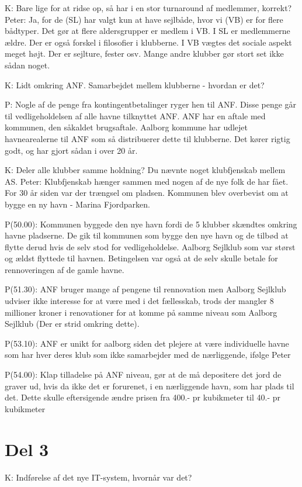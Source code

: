 K: Bare lige for at ridse op, så har i en stor turnaround af medlemmer, korrekt? Peter: Ja, for de (SL) har valgt kun at have sejlbåde, hvor vi (VB) er for flere bådtyper. Det gør at flere aldersgrupper er medlem i VB. I SL er medlemmerne ældre. Der er også forskel i filosofier i klubberne. I VB vægtes det sociale aspekt meget højt. Der er sejlture, fester osv. Mange andre klubber gør stort set ikke sådan noget.

K: Lidt omkring ANF. Samarbejdet mellem klubberne - hvordan er det?

P: Nogle af de penge fra kontingentbetalinger ryger hen til ANF. Disse penge går til vedligeholdelsen af alle havne tilknyttet ANF. ANF har en aftale med kommunen, den såkaldet brugsaftale. Aalborg kommune har udlejet havnearealerne til ANF som så distribuerer dette til klubberne. Det kører rigtig godt, og har gjort sådan i over 20 år.

K: Deler alle klubber samme holdning? Du nævnte noget klubfjenskab mellem AS. Peter: Klubfjenskab hænger sammen med nogen af de nye folk de har fået. For 30 år siden var der trængsel om pladsen. Kommunen blev overbevist om at bygge en ny havn - Marina Fjordparken.


P(50.00): Kommunen byggede den nye havn fordi de 5 klubber skændtes omkring havne pladserne. De gik til kommunen som bygge den nye havn og de tilbød at flytte derud hvis de selv stod for vedligeholdelse. Aalborg Sejlklub som var størst og ældst flyttede til havnen. Betingelsen var også at de selv skulle betale for rennoveringen af de gamle havne.

P(51.30): ANF bruger mange af pengene til rennovation men Aalborg Sejlklub udviser ikke interesse for at være med i det fællesskab, trods der mangler 8 millioner kroner i renovationer for at komme på samme niveau som Aalborg Sejlklub (Der er strid omkring dette).

P(53.10): ANF er unikt for aalborg siden det plejere at være individuelle havne som har hver deres klub som ikke samarbejder med de nærliggende, ifølge Peter

P(54.00): Klap tilladelse på ANF niveau, gør at de må depositere det jord de graver ud, hvis da ikke det er forurenet, i en nærliggende havn, som har plads til det. Dette skulle eftersigende ændre prisen fra 400.- pr kubikmeter til 40.- pr kubikmeter


\section{Del 3}
K: Indførelse af det nye IT-system, hvornår var det?


